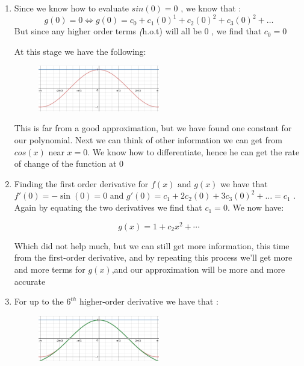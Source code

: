 \documentclass[english,course]{Notes}
\newcommand{\ita}[1]{\textit{#1}}
\begin{document}
\begin{enumerate}
	\item Since we know how to evaluate $sin(0) = 0$ , we know that : 
	$$g(0) = 0 \iff g(0) = c_0 + c_1(0)^1 + c_2(0)^2 + c_3(0)^2 + \dots$$ 
	But since any higher order terms \ita(h.o.t) will all be 0 , we find that $c_0 = 0$
	
	At this stage we have the following:


\begin{figure}[h]
\centering
\includegraphics[width=0.5\textwidth]{taylor1st}
\end{figure}


\par{ This is far from a good approximation, but we have found one constant for our polynomial. Next we can think of other information we can get from $cos(x)$ near $x=0$. We know how to differentiate, hence he can get the rate of change of the function at $0$}

\item Finding the first order derivative for $f(x) \text{ and } g(x)$ we have that $f'(0) = -\sin(0) = 0$ and $g'(0) =  c_1 + 2c_2(0) + 3c_3(0)^2 + \dots = c_1$ . Again by equating the two derivatives we find that $c_1 = 0$. We now have: 

$$ g(x) = 1 + c_2x^2 + \cdots $$

\par{ Which did not help much, but we can still get more information, this time from the first-order derivative, and by repeating this process we'll get more and more terms for $g(x)$,and our approximation will be more and more accurate}

\item For up to the $6^{th}$ higher-order derivative we have that :

\begin{figure}[h]
\centering
\includegraphics[width=0.5\textwidth]{taylor2nd}
\end{figure}



\end{enumerate}
\end{document}
